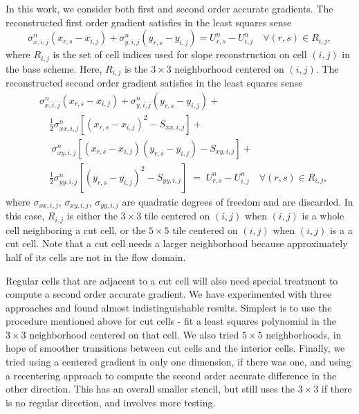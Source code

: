 In this work, we consider both first and second order accurate 
gradients.  The reconstructed first order gradient satisfies in the 
least squares sense
\begin{equation}\label{eqn:linrecon_base}
\sigma^n_{x,i,j}(x_{r,s} - x_{i,j}) +
\sigma^n_{y,i,j}(y_{r,s} - y_{i,j})=
U^n_{r,s} - U^n_{i, j} \quad \forall (r,s) \in R_{i,j},
\end{equation}
where $R_{i,j}$ is the set of cell indices used for slope reconstruction on cell $(i,j)$ in the 
base scheme.  Here, $R_{i,j}$ is the $3\times 3$ neighborhood  centered on $(i,j)$.
The reconstructed second order gradient satisfies in the least squares sense
\begin{equation}
\begin{aligned}\label{eqn:linrecon_base2}
&\sigma^n_{x,i,j}(x_{r,s} - x_{i,j}) +
\sigma^n_{y,i,j}(y_{r,s} - y_{i,j})  + \\
&\quad \frac{1}{2}\sigma^n_{xx,i,j}[(x_{r,s} - x_{i,j})^2 - S_{xx,i,j}]  + \\
& \quad \; \sigma^n_{xy,i,j}[(x_{r,s} - x_{i,j})(y_{r,s} - y_{i,j})-S_{xy,i,j}] +\\
&\quad  \frac{1}{2}\sigma^n_{yy,i,j}[(y_{r,s} - y_{i,j})^2 - S_{yy,i,j}]
 \; = \;  U^n_{r,s} - U^n_{i, j} \quad \forall (r,s) \in R_{i,j},
\end{aligned}
\end{equation}
where $\sigma_{xx,i,j}$, $\sigma_{xy,i,j}$, $\sigma_{yy,i,j}$ are quadratic degrees of freedom and are discarded.  In this case, $R_{i,j}$ is either the $3\times 3$ tile centered on $(i,j)$ when $(i,j)$ is a whole cell neighboring a cut cell, or the $5\times 5$ tile centered on $(i,j)$ when $(i,j)$ is a a cut cell.
Note that a cut cell needs a larger neighborhood because 
approximately half of its cells are not in the flow domain.  

Regular cells that are adjacent to a cut cell will also need special treatment to
compute a second order accurate gradient. We have experimented with three  approaches
and found almost indistinguishable results. Simplest is to use the 
procedure mentioned above for cut cells
- fit a least squares polynomial in the $3 \times 3$ neighborhood centered on that cell.
We also tried $5 \times 5$ neighborhoods, in hope of smoother transitions between cut cells
and the interior cells.  Finally, we tried using a centered
gradient in only one dimension, if there was one, and using a recentering approach to 
compute the second order accurate difference in the other direction.  This has an overall
smaller stencil, but still uses the $3 \times 3$ if there is no regular direction,
and involves more testing.  

